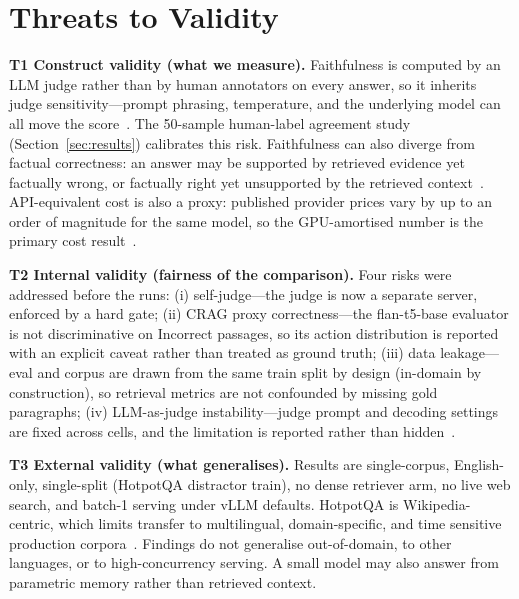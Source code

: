 
\section{Threats to Validity}
\label{sec:threats}

\textbf{T1 Construct validity (what we measure).}
Faithfulness is computed by an LLM judge rather than by human annotators
on every answer, so it inherits judge sensitivity---prompt phrasing,
temperature, and the underlying model can all move the
score~\cite{es2023ragas,murugaraj2025ragvue}. The 50-sample human-label
agreement study (Section~\ref{sec:results}) calibrates this risk.
Faithfulness can also diverge from factual correctness: an answer may be
supported by retrieved evidence yet factually wrong, or factually right
yet unsupported by the retrieved context~\cite{murugaraj2025ragvue}.
API-equivalent cost is also a proxy: published provider prices vary by up
to an order of magnitude for the same model, so the GPU-amortised number
is the primary cost result~\cite{elkiran2026empirical}.

\textbf{T2 Internal validity (fairness of the comparison).}
Four risks were addressed before the runs: (i) self-judge---the judge is
now a separate server, enforced by a hard gate; (ii) CRAG proxy
correctness---the flan-t5-base evaluator is not discriminative on
Incorrect passages, so its action distribution is reported with an
explicit caveat rather than treated as ground truth; (iii) data
leakage---eval and corpus are drawn from the same train split by design
(in-domain by construction), so retrieval metrics are not confounded by
missing gold paragraphs; (iv) LLM-as-judge instability---judge prompt and
decoding settings are fixed across cells, and the limitation is reported
rather than hidden~\cite{murugaraj2025ragvue}.

\textbf{T3 External validity (what generalises).}
Results are single-corpus, English-only, single-split (HotpotQA
distractor train), no dense retriever arm, no live web search, and
batch-1 serving under vLLM defaults. HotpotQA is Wikipedia-centric,
which limits transfer to multilingual, domain-specific, and time
sensitive production corpora~\cite{wu2024survey,elkiran2026empirical,zeng2025rare,li2025biomedical}.
Findings do not generalise out-of-domain, to other languages, or to
high-concurrency serving. A small model may also answer from parametric
memory rather than retrieved context.

